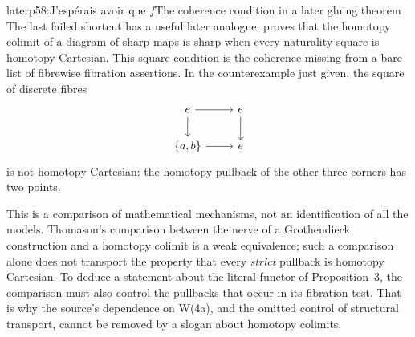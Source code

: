 \begin{dcomment}{later}{p58:J'espérais avoir que $f$}{The coherence condition in a later gluing theorem}
The last failed shortcut has a useful later analogue. \citet[Theorem~7.1]{Rezk1998Sharp} proves that the homotopy colimit of a diagram of sharp maps is sharp when every naturality square is homotopy Cartesian. This square condition is the coherence missing from a bare list of fibrewise fibration assertions. In the counterexample just given, the square of discrete fibres
\[
\begin{tikzcd}
 e\arrow[r]\arrow[d] & e\arrow[d]\\
 \{a,b\}\arrow[r] & e
\end{tikzcd}
\]
is not homotopy Cartesian: the homotopy pullback of the other three corners has two points.

This is a comparison of mathematical mechanisms, not an identification of all the models. Thomason's comparison between the nerve of a Grothendieck construction and a homotopy colimit is a weak equivalence; such a comparison alone does not transport the property that every \emph{strict} pullback is homotopy Cartesian. To deduce a statement about the literal functor of Proposition~3, the comparison must also control the pullbacks that occur in its fibration test. That is why the source's dependence on W(4a), and the omitted control of structural transport, cannot be removed by a slogan about homotopy colimits.
\end{dcomment}
